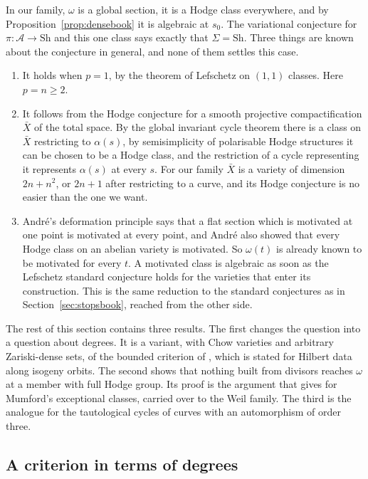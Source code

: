 In our family, $\omega$ is a global section, it is a Hodge class
everywhere, and by Proposition~\ref{prop:densebook} it is algebraic at $s_{0}$.
The variational conjecture for $\pi\colon\mathcal A\to\mathrm{Sh}$ and this one
class says exactly that $\Sigma=\mathrm{Sh}$. Three things are known about the
conjecture in general, and none of them settles this case.
\begin{enumerate}[label=(\alph*)]
\item It holds when $p=1$, by the theorem of Lefschetz on $(1,1)$ classes.
Here $p=n\ge2$.
\item It follows from the Hodge conjecture for a smooth projective
compactification $\bar X$ of the total space. By the global invariant cycle
theorem \cite{Del71} there is a class on $\bar X$ restricting to
$\alpha(s)$, by semisimplicity of polarisable Hodge structures it can be
chosen to be a Hodge class, and the restriction of a cycle representing it
represents $\alpha(s)$ at every $s$. For our family $\bar X$ is a variety
of dimension $2n+n^{2}$, or $2n+1$ after restricting to a curve, and its
Hodge conjecture is no easier than the one we want.
\item Andr\'e's deformation principle \cite{And96} says that a flat section
which is motivated at one point is motivated at every point, and Andr\'e
also showed that every Hodge class on an abelian variety is motivated. So
$\omega(t)$ is already known to be motivated for every $t$. A motivated
class is algebraic as soon as the Lefschetz standard conjecture holds for
the varieties that enter its construction. This is the same reduction to
the standard conjectures as in Section~\ref{sec:stopsbook}, reached from the
other side.
\end{enumerate}

The rest of this section contains three results. The first changes the
question into a question about degrees. It is a variant, with Chow
varieties and arbitrary Zariski-dense sets, of the bounded criterion of
\cite{BhH8}, which is stated for Hilbert data along isogeny orbits. The
second shows that nothing built from divisors reaches $\omega$ at a member
with full Hodge group. Its proof is the argument that \cite{BhH8} gives for
Mumford's exceptional classes, carried over to the Weil family. The third
is the analogue for the tautological cycles of curves with an automorphism
of order three.

\subsection{A criterion in terms of degrees}

